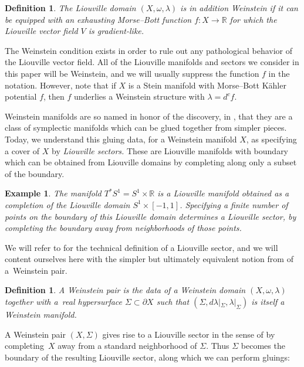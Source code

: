 \documentclass[10pt,a4paper]{amsart}
\numberwithin{equation}{section}
\newtheorem{Definition}[Theorem]{Definition}
\newtheorem{Example}[Theorem]{Example}
\def\RR{\mathbb{R}}
\begin{document}
 \begin{Definition}
 The Liouville domain $(X,\omega,\lambda)$ is in addition {\em Weinstein} if it can be equipped with an exhausting Morse--Bott function $f\colon X\to \RR$ for which the Liouville vector field $V$ is gradient-like.
\end{Definition}
The Weinstein condition exists in order to rule out any pathological behavior of the Liouville vector field. All of the Liouville manifolds and sectors we consider in this paper will be Weinstein, and we will usually suppress the function $f$ in the notation. However, note that if $X$ is a Stein manifold with Morse--Bott K\"ahler potential $f$, then $f$ underlies a Weinstein structure with $\lambda = d^cf$.

Weinstein manifolds are so named in honor of the discovery, in \cite{Weinstein}, that they are a class of symplectic manifolds which can be glued together from simpler pieces. Today, we understand this gluing data, for a Weinstein manifold $X$, as specifying a cover of $X$ by {\em Liouville sectors.} These are Liouville manifolds with boundary which can be obtained from Liouville domains by completing along only a subset of the boundary.

\begin{Example}
	The manifold $T^*S^1=S^1\times \RR$ is a Liouville manifold obtained as a completion of the Liouville domain $S^1\times [-1,1]$. Specifying a finite number of points on the boundary of this Liouville domain determines a Liouville sector, by completing the boundary away from neighborhoods of those points.
\end{Example}

We will refer to \cite[Definition 1.1]{GPS1} for the technical definition of a Liouville sector, and we will content ourselves here with the simpler but ultimately equivalent notion from \cite{Eliashberg-revisited} of a~Weinstein pair.

\begin{Definition}
 A {\em Weinstein pair} is the data of a Weinstein domain $(X,\omega,\lambda)$ together with a~real hypersurface $\Sigma\subset \partial X$ such that $(\Sigma,d\lambda|_\Sigma,\lambda|_\Sigma)$ is itself a Weinstein manifold.
\end{Definition}

A Weinstein pair $(X,\Sigma)$ gives rise to a Liouville sector in the sense of \cite{GPS1} by completing~$X$ away from a standard neighborhood of $\Sigma$. Thus $\Sigma$ becomes the boundary of the resulting Liouville sector, along which we can perform gluings:
\end{document}
